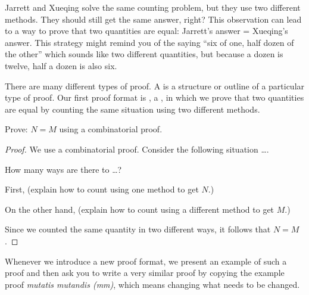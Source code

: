 Jarrett and Xueqing solve the same counting problem, but they use two different methods.  They should still get the same answer, right?  This observation can lead to a way to prove that two quantities are equal: Jarrett's answer = Xueqing's answer.  This strategy might remind you of the saying ``six of one, half dozen of the other'' which sounds like two different quantities, but because a dozen is twelve, half a dozen is also six.

There are many different types of proof. A  is a structure or outline of a particular type of proof.  Our first proof format is , a , in which we prove that two quantities are equal by counting the same situation using two different methods.

\begin{pff} 
\label{pff_comb_proof} 
Prove: $N=M$ using a combinatorial proof.
    \begin{proof}
        We use a combinatorial proof. Consider the following situation \ldots. 
  
        How many ways are there to \ldots? 
        
        First, (explain how to count using one method to get $N$.) 
        
        On the other hand, (explain how to count using a different method to get $M$.) 
        
        Since we counted the same quantity in two different ways, it follows that $N=M$.  
\end{proof}
\end{pff}

Whenever we introduce a new proof format, we present an example of such a proof and then ask you to write a very similar proof by copying the example proof \emph{mutatis mutandis (mm)}, which means changing what needs to be changed. 

